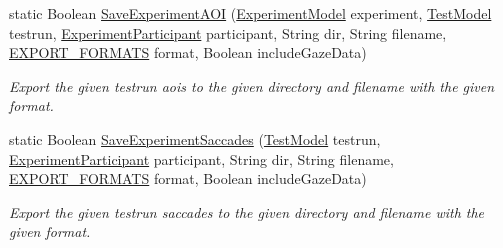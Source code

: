 \begin{DoxyCompactItemize}
static Boolean \hyperlink{class_web_analyzer_1_1_controller_1_1_export_controller_a3bf67d51c5be3abf110a145a472049f8}{Save\+Experiment\+A\+O\+I} (\hyperlink{class_web_analyzer_1_1_models_1_1_base_1_1_experiment_model}{Experiment\+Model} experiment, \hyperlink{class_web_analyzer_1_1_models_1_1_data_model_1_1_test_model}{Test\+Model} testrun, \hyperlink{class_web_analyzer_1_1_models_1_1_base_1_1_experiment_participant}{Experiment\+Participant} participant, String dir, String filename, \hyperlink{class_web_analyzer_1_1_controller_1_1_export_controller_a8cea4a311ecaf495f305f9d7829a57aa}{E\+X\+P\+O\+R\+T\+\_\+\+F\+O\+R\+M\+A\+T\+S} format, Boolean include\+Gaze\+Data)
\begin{DoxyCompactList}\small\item\em Export the given testrun aois to the given directory and filename with the given format. \end{DoxyCompactList}\item 
static Boolean \hyperlink{class_web_analyzer_1_1_controller_1_1_export_controller_a9c72f57f079de884e7e029abf4283e41}{Save\+Experiment\+Saccades} (\hyperlink{class_web_analyzer_1_1_models_1_1_data_model_1_1_test_model}{Test\+Model} testrun, \hyperlink{class_web_analyzer_1_1_models_1_1_base_1_1_experiment_participant}{Experiment\+Participant} participant, String dir, String filename, \hyperlink{class_web_analyzer_1_1_controller_1_1_export_controller_a8cea4a311ecaf495f305f9d7829a57aa}{E\+X\+P\+O\+R\+T\+\_\+\+F\+O\+R\+M\+A\+T\+S} format, Boolean include\+Gaze\+Data)
\begin{DoxyCompactList}\small\item\em Export the given testrun saccades to the given directory and filename with the given format. \end{DoxyCompactList}\end{DoxyCompactItemize}
